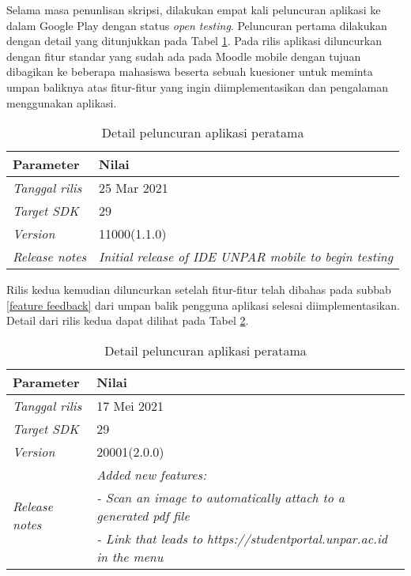 Selama masa penunlisan skripsi, dilakukan empat kali peluncuran aplikasi ke dalam Google Play dengan status \textit{open testing}. Peluncuran pertama dilakukan dengan detail yang ditunjukkan pada Tabel \ref{app:release:first}. Pada rilis aplikasi diluncurkan dengan fitur standar yang sudah ada pada Moodle mobile dengan tujuan dibagikan ke beberapa mahasiswa beserta sebuah kuesioner untuk meminta umpan baliknya atas fitur-fitur yang ingin diimplementasikan dan pengalaman menggunakan aplikasi.

\begin{table}[ht]
\caption{Detail peluncuran aplikasi peratama}
\centering
\begin{tabular}{|l | l |}
\hline
\textbf{Parameter} & \textbf{Nilai} \\  \hline
\textit{Tanggal rilis}  &  25 Mar 2021 \\ \hline
\textit{Target SDK} & 29 \\ \hline
\textit{Version} &  11000(1.1.0) \\ \hline
\textit{Release notes} & \textit{Initial release of IDE UNPAR mobile to begin testing} \\ 
\hline
\end{tabular}
\label{app:release:first}
\end{table}

Rilis kedua kemudian diluncurkan setelah fitur-fitur telah dibahas pada subbab \ref{feature feedback} dari umpan balik pengguna aplikasi selesai diimplementasikan. Detail dari rilis kedua dapat dilihat pada Tabel \ref{app:release:second}. 

\begin{table}[H]
\caption{Detail peluncuran aplikasi peratama}
\centering
\begin{tabular}{|l | l |}
\hline
\textbf{Parameter} & \textbf{Nilai} \\  \hline
\textit{Tanggal rilis}  &  17  Mei 2021 \\ \hline
\textit{Target SDK} & 29 \\ \hline
\textit{Version} &  20001(2.0.0) \\ \hline
\multirow{3}{*}{\textit{Release notes}} &  \textit{Added new features:} \\ & \textit{- Scan an image to automatically attach to a generated pdf file}\\ &  \textit{- Link that leads to https://studentportal.unpar.ac.id in the menu} \\ 
\hline
\end{tabular}
\label{app:release:second}
\end{table}

